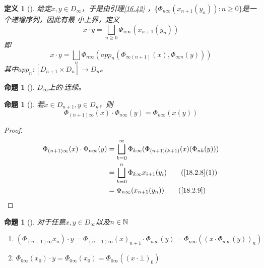 \documentclass{jams-l}
\newtheorem{proposition}[theorem]{命题}
\newtheorem{definition}[theorem]{定义}
\begin{document}
\begin{definition}[]
给定\(x,y\in D_\infty\)，于是由引理\ref{16.42} ，\(\{\Phi_{n\infty}(x_{n+1}(y_n)):n\ge 0\}\)是一个递增序列，因此有最
小上界，定义
\begin{equation*}
x\cdot y=\bigsqcup_{n\ge 0}\Phi_{n\infty}(x_{n+1}(y_n))
\end{equation*}
即
\begin{equation*}
x\cdot y=\bigsqcup_n\Phi_{n\infty}(app_n(\Phi_{\infty(n+1)}(x),\Phi_{\infty n}(y)))
\end{equation*}
其中\(app_n:[D_{n+1}\times D_n]\to D_n\)。
\end{definition}


\begin{proposition}[]
\label{18.2.11}
\(D_\infty\)上的\(\cdot\)连续。
\end{proposition}

\begin{proposition}[]
\label{18.2.12}
若\(x\in D_{n+1},y\in D_n\)，则
\begin{equation*}
\Phi_{(n+1)\infty}(x)\cdot\Phi_{n\infty}(y)=\Phi_{n\infty}(x(y))
\end{equation*}
\end{proposition}

\begin{proof}
\begin{align*}
\Phi_{(n+1)\infty}(x)\cdot\Phi_{n\infty}(y)&=
\bigsqcup_{k=0}^\infty\Phi_{k\infty}(\Phi_{(n+1)(k+1)}(x)(\Phi_{nk}(y)))\\
&=\bigsqcup_{k=0}^n\Phi_{k\infty}x_{i+1}(y_i)\tag{\ref{18.2.8}(1)}\\
&=\Phi_{n\infty}(x_{n+1}(y_n))\tag{\ref{18.2.9}}
\end{align*}
\end{proof}

\begin{proposition}[]
\label{18.2.13}
对于任意\(x,y\in D_\infty\)以及\(n\in\mathbb{N}\)
\begin{enumerate}
\item \((\Phi_{(n+1)\infty}x_n)\cdot y=\Phi_{(n+1)\infty}(x)_{n+1}\cdot\Phi_{n\infty}(y)=\Phi_{n\infty}((x\cdot\Phi_{n\infty}(y))_n)\)
\item \(\Phi_{0\infty}(x_0)\cdot y=\Phi_{0\infty}(x_0)=\Phi_{0\infty}((x\cdot\bot)_0)\)
\end{enumerate}
\end{proposition}
\end{document}
